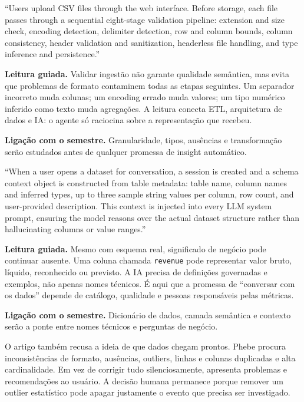 \begin{ArticleBox}
``Users upload CSV files through the web interface. Before storage, each file passes through a sequential eight-stage validation pipeline: extension and size check, encoding detection, delimiter detection, row and column bounds, column consistency, header validation and sanitization, headerless file handling, and type inference and persistence.''
\end{ArticleBox}

\noindent\textbf{Leitura guiada.} Validar ingestão não garante qualidade semântica, mas evita que problemas de formato contaminem todas as etapas seguintes. Um separador incorreto muda colunas; um encoding errado muda valores; um tipo numérico inferido como texto muda agregações. A leitura conecta ETL, arquitetura de dados e IA: o agente só raciocina sobre a representação que recebeu.

\noindent\textbf{Ligação com o semestre.} Granularidade, tipos, ausências e transformação serão estudados antes de qualquer promessa de insight automático.

\begin{ArticleBox}
``When a user opens a dataset for conversation, a session is created and a schema context object is constructed from table metadata: table name, column names and inferred types, up to three sample string values per column, row count, and user-provided description. This context is injected into every LLM system prompt, ensuring the model reasons over the actual dataset structure rather than hallucinating columns or value ranges.''
\end{ArticleBox}

\noindent\textbf{Leitura guiada.} Mesmo com esquema real, significado de negócio pode continuar ausente. Uma coluna chamada \texttt{revenue} pode representar valor bruto, líquido, reconhecido ou previsto. A IA precisa de definições governadas e exemplos, não apenas nomes técnicos. É aqui que a promessa de ``conversar com os dados'' depende de catálogo, qualidade e pessoas responsáveis pelas métricas.

\noindent\textbf{Ligação com o semestre.} Dicionário de dados, camada semântica e contexto serão a ponte entre nomes técnicos e perguntas de negócio.

O artigo também recusa a ideia de que dados chegam prontos. Phebe procura inconsistências de formato, ausências, outliers, linhas e colunas duplicadas e alta cardinalidade. Em vez de corrigir tudo silenciosamente, apresenta problemas e recomendações ao usuário. A decisão humana permanece porque remover um outlier estatístico pode apagar justamente o evento que precisa ser investigado.

